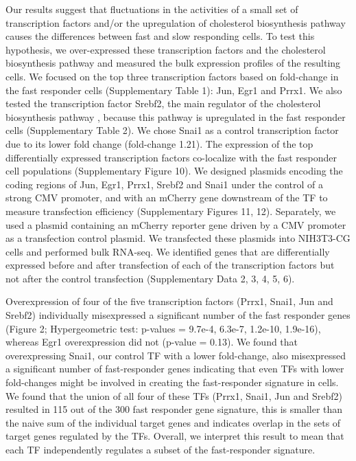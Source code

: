 Our results suggest that fluctuations in the activities of a small set of transcription factors and/or the upregulation of cholesterol biosynthesis pathway causes the differences between fast and slow responding cells. To test this hypothesis, we over-expressed these transcription factors and the cholesterol biosynthesis pathway and measured the bulk expression profiles of the resulting cells. We focused on the top three transcription factors based on fold-change in the fast responder cells (Supplementary Table 1): Jun, Egr1 and Prrx1. We also tested the transcription factor Srebf2, the main regulator of the cholesterol biosynthesis pathway \cite{Horton1998-lj}, because this pathway is upregulated in the fast responder cells (Supplementary Table 2). We chose Snai1 as a control transcription factor due to its lower fold change (fold-change 1.21). The expression of the top differentially expressed transcription factors co-localize with the fast responder cell populations (Supplementary Figure 10). We designed plasmids encoding the coding regions of Jun, Egr1, Prrx1, Srebf2 and Snai1 under the control of a strong CMV promoter, and with an mCherry gene downstream of the TF to measure transfection efficiency (Supplementary Figures 11, 12). Separately, we used a plasmid containing an mCherry reporter gene driven by a CMV promoter as a transfection control plasmid. We transfected these plasmids into NIH3T3-CG cells and performed bulk RNA-seq. We identified genes that are differentially expressed before and after transfection of each of the transcription factors but not after the control transfection (Supplementary Data 2, 3, 4, 5, 6).

Overexpression of four of the five transcription factors (Prrx1, Snai1, Jun and Srebf2) individually misexpressed a significant number of the fast responder genes (Figure 2; Hypergeometric test: p-values = 9.7e-4, 6.3e-7, 1.2e-10, 1.9e-16), whereas Egr1 overexpression did not (p-value = 0.13). We found that overexpressing Snai1, our control TF with a lower fold-change, also misexpressed a significant number of fast-responder genes indicating that even TFs with lower fold-changes might be involved in creating the fast-responder signature in cells. We found that the union of all four of these TFs (Prrx1, Snai1, Jun and Srebf2) resulted in 115 out of the 300 fast responder gene signature, this is smaller than the naive sum of the individual target genes and indicates overlap in the sets of target genes regulated by the TFs. Overall, we interpret this result to mean that each TF independently regulates a subset of the fast-responder signature.

